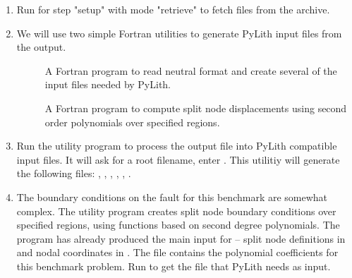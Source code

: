 \begin{enumerate}
\item Run  for step "setup" with mode "retrieve" to
  fetch files from the archive.

  \begin{screen}
    \shellprompt{}
  \end{screen}
  
\item We will use two simple Fortran utilities to generate PyLith
  input files from the  output.

  \begin{description}
  \item[] A Fortran program to read
     neutral format and create several of the
    input files needed by PyLith.
  \item[] A Fortran program to compute split node
    displacements using second order polynomials over specified
    regions.
  \end{description}
  
\item Run the  utility program to process the
   output file into PyLith compatible input files.
  It will ask for a root filename, enter . This
  utilitiy will generate the following files:
  , ,
  , ,
  , .

  \begin{screen}
    \shellprompt{}
  \end{screen}
  
\item The boundary conditions on the fault for this benchmark are
  somewhat complex. The utility program  creates
  split node boundary conditions over specified regions, using
  functions based on second degree polynomials. The
   program has already produced the main input for
   -- split node definitions in
   and nodal coordinates in
  . The file 
  contains the polynomial coefficients for this benchmark problem. Run
   to get the  file that
  PyLith needs as input.


\end{enumerate}
